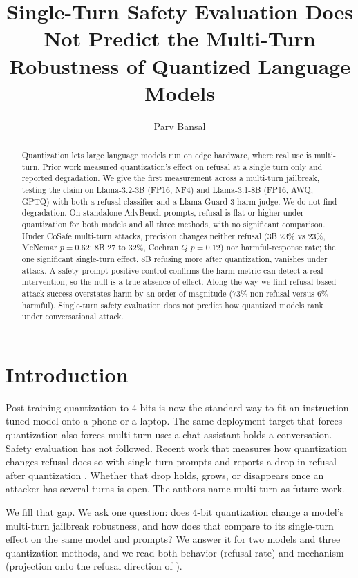 \documentclass[letterpaper]{article} %
\title{Single-Turn Safety Evaluation Does Not Predict the Multi-Turn Robustness of Quantized Language Models}
\author{
    Parv Bansal
}
\begin{document}
\maketitle

\begin{abstract}
Quantization lets large language models run on edge hardware, where real use is
multi-turn. Prior work measured quantization's effect on refusal at a single turn
only and reported degradation. We give the first measurement across a multi-turn
jailbreak, testing the claim on Llama-3.2-3B (FP16, NF4) and Llama-3.1-8B (FP16,
AWQ, GPTQ) with both a refusal classifier and a Llama Guard 3 harm judge. We do
not find degradation. On standalone AdvBench prompts, refusal is flat or higher
under quantization for both models and all three methods, with no significant
comparison. Under CoSafe multi-turn attacks, precision changes neither refusal
(3B 23\% vs 23\%, McNemar $p=0.62$; 8B 27 to 32\%, Cochran $Q$ $p=0.12$) nor
harmful-response rate; the one significant single-turn effect, 8B refusing more
after quantization, vanishes under attack. A safety-prompt positive control
confirms the harm metric can detect a real intervention, so the null is a true
absence of effect. Along the way we find refusal-based attack success overstates
harm by an order of magnitude (73\% non-refusal versus 6\% harmful). Single-turn
safety evaluation does not predict how quantized models rank under conversational
attack.
\end{abstract}

\section{Introduction}
Post-training quantization to 4 bits is now the standard way to fit an
instruction-tuned model onto a phone or a laptop. The same deployment target
that forces quantization also forces multi-turn use: a chat assistant holds a
conversation. Safety evaluation has not followed. Recent work that measures how
quantization changes refusal does so with single-turn prompts and reports a drop
in refusal after quantization \citep{kadadekar2026quality}. Whether that drop
holds, grows, or disappears once an attacker has several turns is open. The
authors name multi-turn as future work.

We fill that gap. We ask one question: does 4-bit quantization change a model's
multi-turn jailbreak robustness, and how does that compare to its single-turn
effect on the same model and prompts? We answer it for two models and three
quantization methods, and we read both behavior (refusal rate) and mechanism
(projection onto the refusal direction of \citet{arditi2024refusal}).
\end{document}
